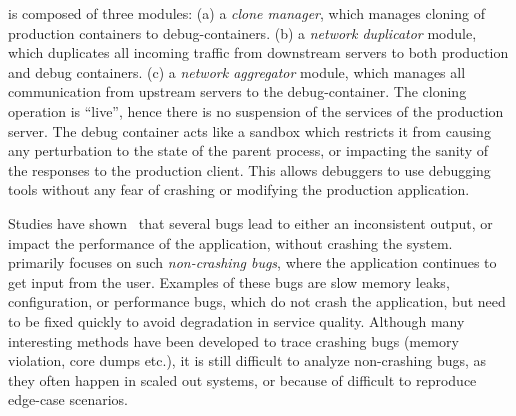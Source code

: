 \parikshan is composed of three modules:
(a) a \textit{clone manager}, which manages cloning of production containers to debug-containers.
(b) a \textit{network duplicator} module, which duplicates all incoming traffic from downstream servers to both production and debug containers.
(c) a \textit{network aggregator} module, which manages all communication from upstream servers to the debug-container.
The cloning operation is ``live'', hence there is no suspension of the services of the production server.
The debug container acts like a sandbox which restricts it from causing any perturbation to the state of the parent process, or impacting the sanity of the responses to the production client. 
This allows debuggers to use debugging tools without any fear of crashing or modifying the production application.

\iffalse
This is done by cloning an application container, and creating two containers: a production container, and a debug container. 
We duplicate incoming traffic from downstream servers to both production and debug containers.
Similarly, we have another module, which replays responses sent from the production container, to the debug container so that it is completely isolated from the network. 
The debugging on the debug-container is done on-the-fly using dynamic instrumentation tools like DTrace~\cite{dtrace}, or iProbe~\cite{iProbe}. 
The cloned debug container acts like a sandbox which restricts it from causing any perturbation to the state of the parent process, or impacting the sanity of the responses to the production client. 
The cloning operation is ``live'', hence there is no suspension of the services of the production server.
\fi

Studies have shown~\cite{Zhang:2013:ADS:2486788.2486830, liu2005mining, kremenek2007factor} that several bugs lead to either an inconsistent output, or impact the performance of the application, without crashing the system.
\parikshan primarily focuses on such \emph{non-crashing bugs}, where the application continues to get input from the user.
Examples of these bugs are slow memory leaks, configuration, or performance bugs, which do not crash the application, but need to be fixed quickly to avoid degradation in service quality. 
Although many interesting methods have been developed to trace crashing bugs (memory violation, core dumps etc.), it is still difficult to analyze non-crashing bugs, as they often happen in scaled out systems, or because of difficult to reproduce edge-case scenarios.

